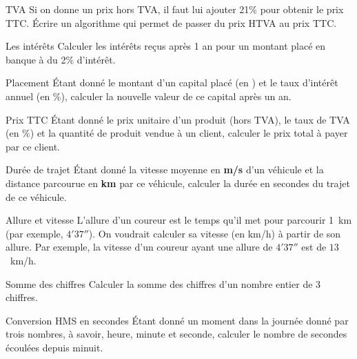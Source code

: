		\begin{Exercice}{TVA}
			Si on donne un prix hors TVA, il faut lui ajouter 21\% 
			pour obtenir le prix TTC. Écrire un algorithme qui permet 
			de passer du prix HTVA au prix TTC.
		\end{Exercice}
	
		\begin{Exercice}{Les intérêts}
			Calculer les intérêts reçus après 1 an pour un montant placé en 
			banque à du 2\% d’intérêt.
		\end{Exercice}
	
		\begin{Exercice}{Placement}
			Étant donné le montant d’un capital placé (en \texteuro) 
			et le taux d’intérêt annuel (en \%), 
			calculer la nouvelle valeur de ce capital après un an.
		\end{Exercice}
	
		\begin{Exercice}{Prix TTC}
			Étant donné le prix unitaire d’un produit
			(hors TVA), le taux de TVA (en \%) et la quantité de produit vendue à
			un client, calculer le prix total à payer par ce client.
		\end{Exercice}
	
		\begin{Exercice}{Durée de trajet}
			Étant donné la vitesse moyenne en \textbf{m/s}
			d’un véhicule et la distance parcourue en \textbf{km} par ce véhicule,
			calculer la durée en secondes du trajet de ce véhicule.
		\end{Exercice}
	
		\begin{Exercice}{Allure et vitesse}
			L’allure d’un coureur est le temps qu’il met pour parcourir 1~km
			(par exemple, $4'37''$).
			On voudrait calculer sa vitesse (en km/h) à partir de son allure.
			Par exemple, la vitesse d’un coureur ayant une allure de
			$4'37''$ est de $13$~km/h. 
		\end{Exercice}
	
		\begin{Exercice}{Somme des chiffres}
			Calculer la somme des chiffres
			d’un nombre entier de 3 chiffres.
		\end{Exercice}
	
		\begin{Exercice}{Conversion HMS en secondes}
			Étant donné un moment dans la journée donné
			par trois nombres, à savoir, heure, minute et seconde, calculer le
			nombre de secondes écoulées depuis minuit.
		\end{Exercice}
	
